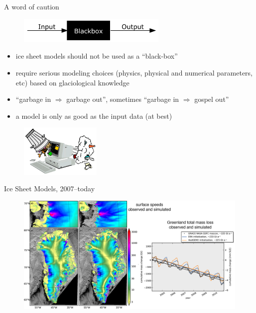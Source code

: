 \documentclass[hide notes,intlimits]{beamer}
\begin{document}
\begin{frame}{A word of caution}
 \begin{figure}
   \includegraphics[height=1.25cm]{blackbox}
\end{figure}
\begin{itemize}
  \item ice sheet models should not be used as a ``black-box''
  \item require serious modeling choices (physics, physical and
numerical parameters, etc) based on glaciological knowledge
  \item \alert{``garbage in $\Rightarrow$ garbage out''}, sometimes
\alert{``garbage in $\Rightarrow$ gospel out''}
  \item a model is only as good as the input data (at best)
 \end{itemize}
 \begin{figure}
  \includegraphics[height=2.5cm]{gigo}
 \end{figure}
\end{frame}


\begin{frame}{Ice Sheet Models, 2007--today}
      \begin{figure}
        \includegraphics[width=\textwidth]{speed_sar_today_grace}
      \end{figure}
\end{frame}
\end{document}
